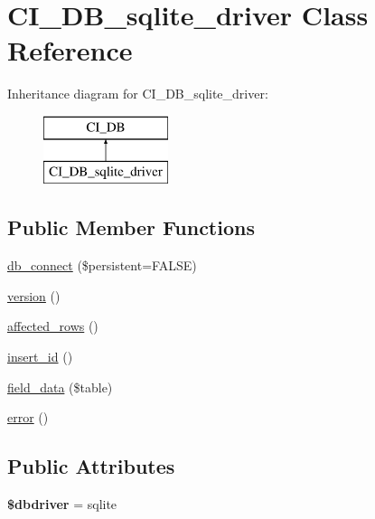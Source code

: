 \hypertarget{class_c_i___d_b__sqlite__driver}{}\section{C\+I\+\_\+\+D\+B\+\_\+sqlite\+\_\+driver Class Reference}
\label{class_c_i___d_b__sqlite__driver}
Inheritance diagram for C\+I\+\_\+\+D\+B\+\_\+sqlite\+\_\+driver\+:\begin{figure}[H]
\begin{center}
\leavevmode
\includegraphics[height=2.000000cm]{class_c_i___d_b__sqlite__driver}
\end{center}
\end{figure}
\subsection*{Public Member Functions}
\begin{DoxyCompactItemize}
\item 
\mbox{\hyperlink{class_c_i___d_b__sqlite__driver_ab602eec8f573aa629059d7cd3753eeae}{db\+\_\+connect}} (\$persistent=F\+A\+L\+SE)
\item 
\mbox{\hyperlink{class_c_i___d_b__sqlite__driver_a000bdad2689dccd84ecc4a23d392cd67}{version}} ()
\item 
\mbox{\hyperlink{class_c_i___d_b__sqlite__driver_adae2e03033a9706676a856792743bf9c}{affected\+\_\+rows}} ()
\item 
\mbox{\hyperlink{class_c_i___d_b__sqlite__driver_a35a96392d3abd9611e8bb9eb6853e1d0}{insert\+\_\+id}} ()
\item 
\mbox{\hyperlink{class_c_i___d_b__sqlite__driver_aad55a8b90027cf7a4104929546a17393}{field\+\_\+data}} (\$table)
\item 
\mbox{\hyperlink{class_c_i___d_b__sqlite__driver_aeb30b8b6fd04f59bc71c1ddd1d8ffabe}{error}} ()
\end{DoxyCompactItemize}
\subsection*{Public Attributes}
\begin{DoxyCompactItemize}
\item 
\mbox{\label{class_c_i___d_b__sqlite__driver_a77a636719328863ac4a8d0fa318a499b}} 
{\bfseries \$dbdriver} = \textquotesingle{}sqlite\textquotesingle{}
\end{DoxyCompactItemize}
